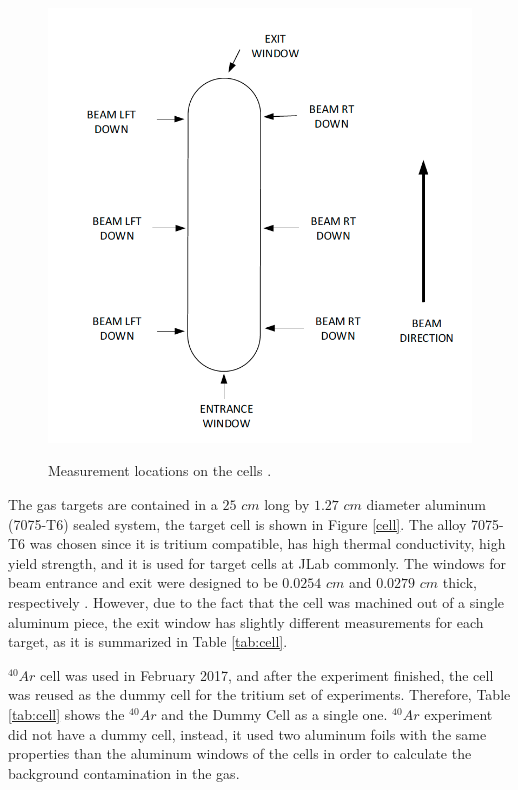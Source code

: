 \documentclass[final,5p,times,twocolumn]{elsarticle}
\begin{document}
\begin{figure}[!h]
\centering
  \includegraphics[width=\linewidth]{images/tgt_measurements.png}\\
  \caption{Measurement locations on the cells \cite{cellconfig}. 
 }\label{fig:cellconfig}
\end{figure}

The gas targets are contained in a $25$ $cm$ long by $1.27$ $cm$ diameter aluminum (7075-T6) sealed system, the target cell is shown in Figure \ref{cell}. 
The alloy 7075-T6 was chosen since it is tritium compatible, has high thermal conductivity, high yield strength, and it is used for target cells at JLab commonly. 
The windows for beam entrance and exit were designed to be $0.0254$ $cm$ and $0.0279$ $cm$ thick, respectively \cite{celldes}. However, due to the fact that 
the cell was machined out of a single aluminum piece, the exit window has slightly different measurements for each target, as it is summarized in Table \ref{tab:cell}.

$^{40}Ar$ cell was used in February 2017, and after the experiment finished, the cell was reused as the dummy cell for the tritium set of experiments. 
Therefore, Table \ref{tab:cell} shows the $^{40}Ar$ and the Dummy Cell as a single one. $^{40}Ar$ experiment did not have a dummy cell, instead, 
it used two aluminum foils with the same properties than the aluminum windows of the cells in order to calculate the background contamination in the gas.
\end{document}
